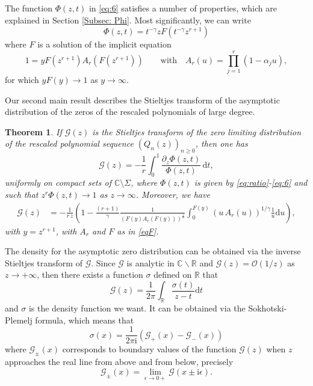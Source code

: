 \documentclass[12pt]{article}
\newcommand{\ii}{\mathrm{i}}
\newcommand{\Gt}{\mathcal{G}} %
\newtheorem{theorem}{Theorem}[section]
\numberwithin{equation}{section}
\begin{document}
The function \(\Phi(z,t)\) in \eqref{eq:6} satisfies a number of properties, which are explained in Section \ref{Subsec: Phi}. Most significantly, we can write 
\[
    \Phi(z,t) = t^{-\gamma} z F(t^{-\gamma} z^{r+1})
\]
where \(F\) is a solution of the implicit equation 
\begin{equation}\label{eqF}
	1= y F\left(z^{r+1}\right)A_r(F\left(z^{r+1}\right))  \qquad \text{with} \quad A_r(u) =  \prod_{j=1}^r \left(1 -\alpha_j u \right), 
\end{equation}
for which \(yF(y) \to 1\) as \(y\to \infty\). 


Our second main result describes the Stieltjes transform of the asymptotic distribution of the zeros of the rescaled polynomials of large degree. 

\begin{theorem}\label{Thm2} If   \( \Gt (z) \) is the Stieltjes transform of the zero limiting distribution 
of the rescaled polynomial sequence \((Q_n(z))_{n\geq 0} \), then one has  
\begin{equation}   \label{eq:13}
  \Gt (z) %
   = - \frac{1}{r} \int_0^1 \frac{\displaystyle \partial_z \Phi(z,t) }{\Phi(z,t)} \, \mathrm{d}t , 
\end{equation}
uniformly on compact sets of $\mathbb{C} \setminus \Sigma$, where \(\Phi(z,t)\) is given by  \eqref{eq:ratio}-\eqref{eq:6} and such that $z^r\Phi(z,t) \to 1$ as $z \to \infty$. Moreover, we have 
\begin{align}
	\Gt (z) %
	&= - \frac{1}{r\,z}  
	\left( 1- \frac{(r+1)}{\gamma} \frac{1}{\left(F(y) A_r(F(y))\right)^{\frac{1}{\gamma}}} \int_0^{F(y)}  \left(u \, A_r(u)\right) ^{1/\gamma}	\frac{1}{u}\mathrm{d}u  \right), \label{G_integral1}
\end{align}
with  \(y=z^{r+1}\), with  \(A_r\) and \(F\) as in \eqref{eqF}. 
\end{theorem}

The density for the asymptotic zero distribution can be obtained via the inverse Stieltjes transform of $\Gt$. Since \(\Gt\) is analytic in \(\mathbb{C}\backslash \mathbb{R}\) and \(\Gt(z)=\mathcal{O}(1/z)\) as \(z\to +\infty\), then there exists a function \(\sigma\) defined on \(\mathbb{R}\) that 
\[\Gt (z) = \frac{1}{2\pi} \int_{\mathbb{R}} \frac{\sigma(t)}{z-t} \mathrm{d} t\] 
and \(\sigma\) is the density function we want. It can be obtained via the Sokhotski-Plemelj formula, which means that 
\[
	\sigma(x) = \frac{1}{2\pi\ii} \left( \Gt_{+}(x) - \Gt_{-}(x) \right)
\]
where \(\Gt_{\pm}(x) \) corresponds to boundary values of the function  \(\Gt(z) \) when \(z\) approaches the real line from above and from below, precisely 
\[\Gt_{\pm}(x) = \lim_{\epsilon \to 0+} \Gt(x\pm\ii \epsilon) . \]
\end{document}
